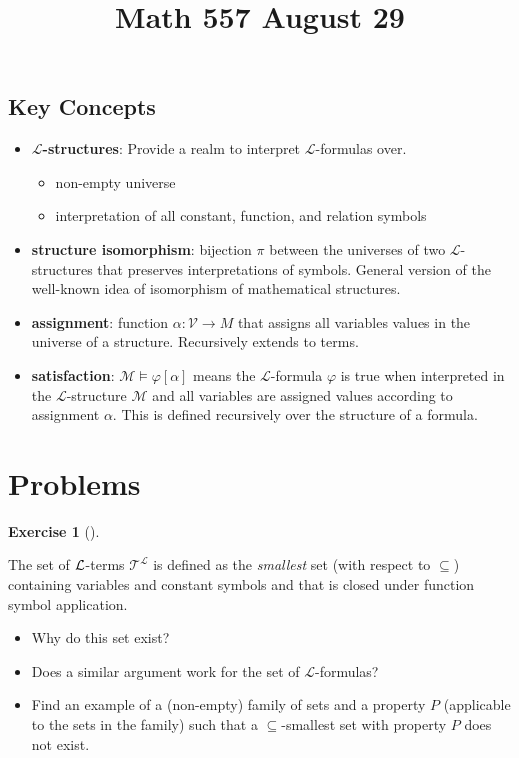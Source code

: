 \documentclass[
]{article}
\title{Math 557 August 29}
\author{}
\date{}
\providecommand{\tightlist}{%
  \setlength{\itemsep}{0pt}\setlength{\parskip}{0pt}}
\theoremstyle{definition}
\newtheorem{exercise}{Exercise}[section]
\theoremstyle{remark}
\begin{document}
\maketitle


\subsection{Key Concepts}\label{key-concepts}

\begin{itemize}
\item
  \textbf{\(\mathcal{L}\)-structures}: Provide a realm to interpret
  \(\mathcal{L}\)-formulas over.

  \begin{itemize}
  \tightlist
  \item
    non-empty universe
  \item
    interpretation of all constant, function, and relation symbols
  \end{itemize}
\item
  \textbf{structure isomorphism}: bijection \(\pi\) between the
  universes of two \(\mathcal{L}\)-structures that preserves
  interpretations of symbols. General version of the well-known idea of
  isomorphism of mathematical structures.
\item
  \textbf{assignment}: function \(\alpha: \mathcal{V} \to M\) that
  assigns all variables values in the universe of a structure.
  Recursively extends to terms.
\item
  \textbf{satisfaction}: \(\mathcal{M} \models \varphi[\alpha]\) means
  the \(\mathcal{L}\)-formula \(\varphi\) is true when interpreted in
  the \(\mathcal{L}\)-structure \(\mathcal{M}\) and all variables are
  assigned values according to assignment \(\alpha\). This is defined
  recursively over the structure of a formula.
\end{itemize}

\section{Problems}\label{problems}

\begin{exercise}[]\protect\hypertarget{exr-}{}\label{exr-}

\hfill\break
The set of \(\cal{L}\)-terms \(\mathcal{T}^{\mathcal{L}}\) is defined as
the \emph{smallest} set (with respect to \(\subseteq\)) containing
variables and constant symbols and that is closed under function symbol
application.

\begin{itemize}
\item
  Why do this set exist?
\item
  Does a similar argument work for the set of \(\mathcal{L}\)-formulas?
\item
  Find an example of a (non-empty) family of sets and a property \(P\)
  (applicable to the sets in the family) such that a
  \(\subseteq\)-smallest set with property \(P\) does not exist.
\end{itemize}

\end{exercise}
\end{document}
